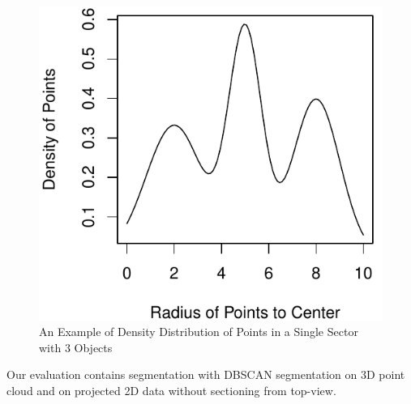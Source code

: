 \begin{figure}[!h]
\begin{center}
  \includegraphics[scale=0.6]{./images/sectors_density.pdf}
  \caption{An Example of Density Distribution of Points in a Single Sector with 3 Objects}
  \label{fig:SectorDensity}
\end{center}
\end{figure}
Our evaluation contains segmentation with DBSCAN segmentation on 3D point cloud and on projected 2D
data without sectioning from top-view.



